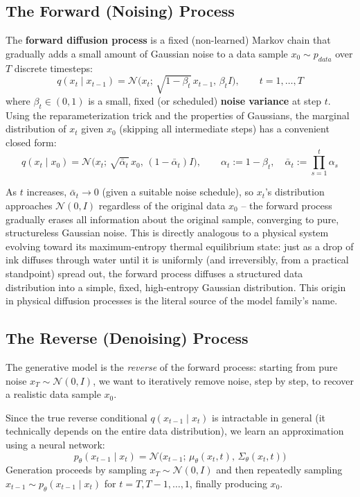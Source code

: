 \documentclass[12pt,a4paper]{article}
\begin{document}
\subsection{The Forward (Noising) Process}

\begin{defbox}
The \textbf{forward diffusion process} is a fixed (non-learned) Markov chain that gradually adds a small amount of Gaussian noise to a data sample $x_0 \sim p_{data}$ over $T$ discrete timesteps:
\[
q(x_t \mid x_{t-1}) = \mathcal{N}\big(x_t;\, \sqrt{1-\beta_t}\, x_{t-1},\, \beta_t I\big), \qquad t = 1, \ldots, T
\]
where $\beta_t \in (0,1)$ is a small, fixed (or scheduled) \textbf{noise variance} at step $t$. Using the reparameterization trick and the properties of Gaussians, the marginal distribution of $x_t$ given $x_0$ (skipping all intermediate steps) has a convenient closed form:
\[
q(x_t \mid x_0) = \mathcal{N}\big(x_t;\, \sqrt{\bar\alpha_t}\, x_0,\, (1-\bar\alpha_t) I\big), \qquad
\alpha_t := 1-\beta_t, \quad \bar\alpha_t := \prod_{s=1}^{t}\alpha_s
\]
\end{defbox}

\begin{keyidea}
As $t$ increases, $\bar\alpha_t \to 0$ (given a suitable noise schedule), so $x_t$'s distribution approaches $\mathcal{N}(0, I)$ regardless of the original data $x_0$ -- the forward process gradually erases all information about the original sample, converging to pure, structureless Gaussian noise. This is directly analogous to a physical system evolving toward its maximum-entropy thermal equilibrium state: just as a drop of ink diffuses through water until it is uniformly (and irreversibly, from a practical standpoint) spread out, the forward process diffuses a structured data distribution into a simple, fixed, high-entropy Gaussian distribution. This origin in physical diffusion processes is the literal source of the model family's name.
\end{keyidea}

\subsection{The Reverse (Denoising) Process}

The generative model is the \emph{reverse} of the forward process: starting from pure noise $x_T \sim \mathcal{N}(0,I)$, we want to iteratively remove noise, step by step, to recover a realistic data sample $x_0$.

\begin{defbox}
Since the true reverse conditional $q(x_{t-1}\mid x_t)$ is intractable in general (it technically depends on the entire data distribution), we learn an approximation using a neural network:
\[
p_\theta(x_{t-1} \mid x_t) = \mathcal{N}\big(x_{t-1};\, \mu_\theta(x_t, t),\, \Sigma_\theta(x_t,t)\big)
\]
Generation proceeds by sampling $x_T \sim \mathcal{N}(0,I)$ and then repeatedly sampling $x_{t-1} \sim p_\theta(x_{t-1}\mid x_t)$ for $t = T, T-1, \ldots, 1$, finally producing $x_0$.
\end{defbox}
\end{document}
